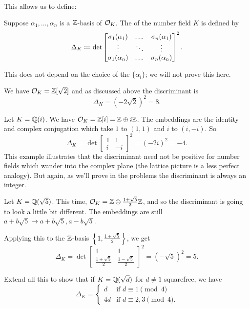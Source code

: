 This allows us to define:
\begin{definition}
	Suppose $\alpha_1, \dots, \alpha_n$ is a $\mathbb Z$-basis of $\mathcal O_K$.
	The  of the number field $K$ is defined by
	\[
	\Delta_K \coloneqq \det
	\begin{bmatrix}
		\sigma_1(\alpha_1) & \dots & \sigma_n(\alpha_1) \\
		\vdots & \ddots & \vdots \\
		\sigma_1(\alpha_n) & \dots & \sigma_n(\alpha_n) \\
	\end{bmatrix}^2.
	\]
\end{definition}
This does not depend on the choice of the $\{\alpha_i\}$;
we will not prove this here.
\begin{example}[Discriminant of $K = \QQ(\sqrt2)$]
	We have $\mathcal O_K = \mathbb Z[\sqrt 2]$
	and as discussed above the discriminant is
	\[
		\Delta_K =
		(-2 \sqrt 2)^2 = 8.
	\]
\end{example}
\begin{example}[Discriminant of $\QQ(i)$]
	Let $K = \mathbb Q(i)$.
	We have $\mathcal O_K = \mathbb Z[i] = \mathbb Z \oplus i \mathbb Z$.
	The embeddings are the identity and complex conjugation
	which take $1$ to $(1,1)$ and $i$ to $(i, -i)$.
	So
	\[
		\Delta_K =
		\det
		\begin{bmatrix}
			1 & 1 \\
			i & -i
		\end{bmatrix}^2
		=
		(-2i)^2 = -4.
	\]
	This example illustrates that the discriminant need not be positive
	for number fields which wander into the complex plane
	(the lattice picture is a less perfect analogy).
	But again, as we'll prove in the problems the discriminant is always
	an integer.
\end{example}
\begin{example}
	Let $K = \mathbb Q(\sqrt5)$.
	This time, $\mathcal O_K = \mathbb Z \oplus \frac{1+\sqrt5}{2} \mathbb Z$, and so the discriminant
	is going to look a little bit different.
	The embeddings are still $a+b\sqrt 5 \mapsto a+b\sqrt5, a-b\sqrt5$.

	Applying this to the $\mathbb Z$-basis $\left\{ 1, \frac{1+\sqrt5}{2} \right\}$, we get
	\[
		\Delta_K
		=
		\det
		\begin{bmatrix}
			1 & 1 \\
			\frac{1+\sqrt5}{2} & \frac{1-\sqrt5}{2}
		\end{bmatrix}^2
		= (-\sqrt 5)^2 = 5.
	\]
\end{example}
\begin{exercise}
	Extend all this to show that
	if $K = \mathbb Q(\sqrt d)$ for $d \neq 1$ squarefree, we have
	\[
		\Delta_K =
		\begin{cases}
			d & \text{if } d \equiv 1 \pmod 4 \\
			4d & \text{if } d \equiv 2, 3 \pmod 4.
		\end{cases}
	\]
\end{exercise}

